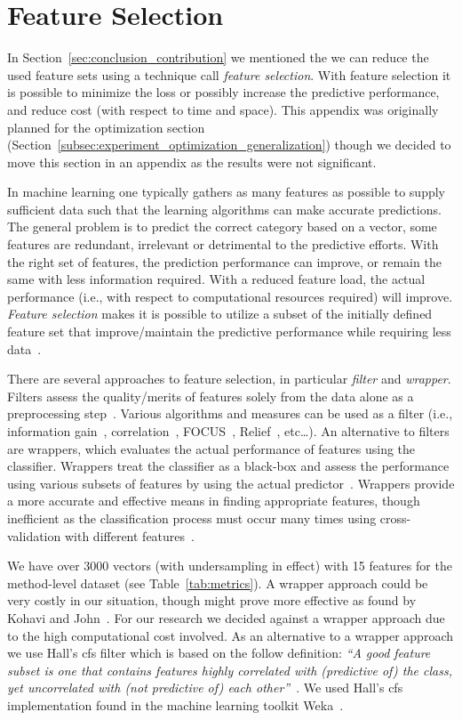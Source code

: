 \chapter{Feature Selection}
\label{app:feature_selection}
In Section~\ref{sec:conclusion_contribution} we mentioned the we can reduce the used feature sets using a technique call \emph{feature selection}. With feature selection it is possible to minimize the loss or possibly increase the predictive performance, and reduce cost (with respect to time and space). This appendix was originally planned for the optimization section (Section~\ref{subsec:experiment_optimization_generalization}) though we decided to move this section in an appendix as the results were not significant.

In machine learning one typically gathers as many features as possible to supply sufficient data such that the learning algorithms can make accurate predictions. The general problem is to predict the correct category based on a vector, some features are redundant, irrelevant or detrimental to the predictive efforts. With the right set of features, the prediction performance can improve, or remain the same with less information required. With a reduced feature load, the actual performance (i.e., with respect to computational resources required) will improve. \emph{Feature selection} makes it is possible to utilize a subset of the initially defined feature set that improve/maintain the predictive performance while requiring less data~\cite{GE03,BL97}.

There are several approaches to feature selection, in particular \emph{filter} and \emph{wrapper}. Filters assess the quality/merits of features solely from the data alone as a preprocessing step~\cite{JKP94,BL97}. Various algorithms and measures can be used as a filter (i.e., information gain~\cite{GE03}, correlation~\cite{Hal99}, FOCUS~\cite{AD91}, Relief~\cite{KR92}, etc\ldots). An alternative to filters are wrappers, which evaluates the actual performance of features using the classifier. Wrappers treat the classifier as a black-box and assess the performance using various subsets of features by using the actual predictor~\cite{JKP94,BL97}. Wrappers provide a more accurate and effective means in finding appropriate features, though inefficient as the classification process must occur many times using cross-validation with different features~\cite{KJ97}.

We have over 3000 vectors (with undersampling in effect) with 15 features for the method-level dataset (see Table~\ref{tab:metrics}). A wrapper approach could be very costly in our situation, though might prove more effective as found by Kohavi and John~\cite{KJ97}. For our research we decided against a wrapper approach due to the high computational cost involved. As an alternative to a wrapper approach we use Hall's \gls{cfs} filter which is based on the follow definition: \emph{``A good feature subset is one that contains features highly correlated with (predictive of) the class, yet uncorrelated with (not predictive of) each other''}~\cite{Hal99}. We used Hall's \gls{cfs} implementation found in the machine learning toolkit Weka~\cite{HFH+09}.

